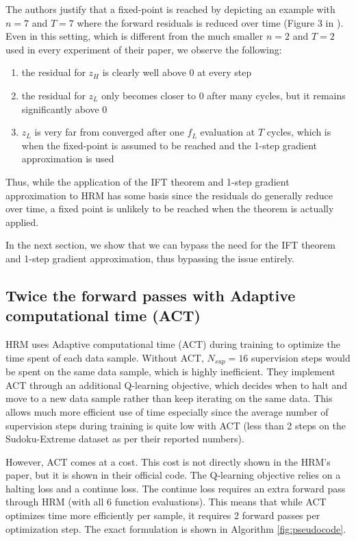 \documentclass{article}
\theoremstyle{plain}
\theoremstyle{definition}
\theoremstyle{remark}
\begin{document}
The authors justify that a fixed-point is reached by depicting an example with $n=7$ and $T=7$ where the forward residuals is reduced over time (Figure 3 in \citet{wang2025hierarchical}). Even in this setting, which is different from the much smaller $n=2$ and $T=2$ used in every experiment of their paper, we observe the following:
\begin{enumerate}
    \item the residual for $z_H$ is clearly well above 0 at every step
    \item the residual for $z_L$ only becomes closer to 0 after many cycles, but it remains significantly above 0
    \item $z_L$ is very far from converged after one $f_L$ evaluation at $T$ cycles, which is when the fixed-point is assumed to be reached and the 1-step gradient approximation is used
\end{enumerate}

Thus, while the application of the IFT theorem and 1-step gradient approximation to HRM has some basis since the residuals do generally reduce over time, a fixed point is unlikely to be reached when the theorem is actually applied.

In the next section, we show that we can bypass the need for the IFT theorem and 1-step gradient approximation, thus bypassing the issue entirely.

\subsection{Twice the forward passes with Adaptive computational time (ACT)}

HRM uses Adaptive computational time (ACT) during training to optimize the time spent of each data sample. Without ACT, $N_{sup}=16$ supervision steps would be spent on the same data sample, which is highly inefficient. They implement ACT through an additional Q-learning objective, which decides when to halt and move to a new data sample rather than keep iterating on the same data. This allows much more efficient use of time especially since the average number of supervision steps during training is quite low with ACT (less than 2 steps on the Sudoku-Extreme dataset as per their reported numbers). 

However, ACT comes at a cost. This cost is not directly shown in the HRM's paper, but it is shown in their official code. The Q-learning objective relies on a halting loss and a continue loss. The continue loss requires an extra forward pass through HRM (with all 6 function evaluations). This means that while ACT optimizes time more efficiently per sample, it requires 2 forward passes per optimization step. The exact formulation is shown in Algorithm \ref{fig:pseudocode}.
\end{document}
